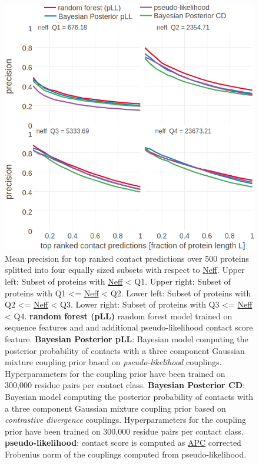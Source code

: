 \documentclass[11pt,a4paper,twoside]{book}
\theoremstyle{definition}
\theoremstyle{definition}
\theoremstyle{remark}
\begin{document}
\begin{figure}

{\centering \includegraphics[width=1\linewidth]{img/bayesian_model/benchmark/precision_vs_rank_pll_vs_cd_3comp_300k_facetted_by_neff} 

}

\caption{Mean
precision for top ranked contact predictions over 500 proteins splitted
into four equally sized subsets with respect to
\protect\hyperlink{abbrev}{Neff}. Upper left: Subset of proteins with
\protect\hyperlink{abbrev}{Neff} \textless{} Q1. Upper right: Subset of
proteins with Q1 \textless{}= \protect\hyperlink{abbrev}{Neff}
\textless{} Q2. Lower left: Subset of proteins with Q2 \textless{}=
\protect\hyperlink{abbrev}{Neff} \textless{} Q3. Lower right: Subset of
proteins with Q3 \textless{}= \protect\hyperlink{abbrev}{Neff}
\textless{} Q4. \textbf{random forest (pLL)} random forest model trained
on sequence features and and additional pseudo-likelihood contact score
feature. \textbf{Bayesian Posterior pLL}: Bayesian model computing the
posterior probability of contacts with a three component Gaussian
mixture coupling prior based on \emph{pseudo-likelihood} couplings.
Hyperparameters for the coupling prior have been trained on 300,000
residue pairs per contact class. \textbf{Bayesian Posterior CD}:
Bayesian model computing the posterior probability of contacts with a
three component Gaussian mixture coupling prior based on
\emph{contrastive divergence} couplings. Hyperparameters for the
coupling prior have been trained on 300,000 residue pairs per contact
class. \textbf{pseudo-likelihood}: contact score is computed as
\protect\hyperlink{abbrev}{APC} corrected Frobenius norm of the
couplings computed from pseudo-likelihood.}\label{fig:precision-bayesian-model-pll-vs-cd-3comp-300k-neff}
\end{figure}
\end{document}
